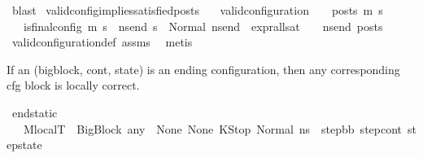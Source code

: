 \begin{isabellebody}
\ blast%
\endisatagproof
{\isafoldproof}%
%
\isadelimproof
\isanewline
%
\endisadelimproof
\isanewline
{}\isamarkupfalse%
\ valid{\isacharunderscore}{\kern0pt}config{\isacharunderscore}{\kern0pt}implies{\isacharunderscore}{\kern0pt}satisfied{\isacharunderscore}{\kern0pt}posts{\isacharcolon}{\kern0pt}\isanewline
\ \ \ {\isachardoublequoteopen}valid{\isacharunderscore}{\kern0pt}configuration\ {\isasymLambda}\ {\isasymGamma}\ {\isasymOmega}\ posts\ m{\isacharprime}{\kern0pt}\ s{\isacharprime}{\kern0pt}{\isachardoublequoteclose}\isanewline
\ \ \ {\isachardoublequoteopen}is{\isacharunderscore}{\kern0pt}final{\isacharunderscore}{\kern0pt}config\ {\isacharparenleft}{\kern0pt}m{\isacharprime}{\kern0pt}{\isacharcomma}{\kern0pt}\ s{\isacharprime}{\kern0pt}{\isacharparenright}{\kern0pt}\ {\isasymLongrightarrow}\ {\isacharparenleft}{\kern0pt}{\isasymforall}ns{\isacharunderscore}{\kern0pt}end{\isachardot}{\kern0pt}\ s{\isacharprime}{\kern0pt}\ {\isacharequal}{\kern0pt}\ Normal\ ns{\isacharunderscore}{\kern0pt}end\ {\isasymlongrightarrow}\ {\isacharparenleft}{\kern0pt}expr{\isacharunderscore}{\kern0pt}all{\isacharunderscore}{\kern0pt}sat\ {\isasymLambda}\ {\isasymGamma}\ {\isasymOmega}\ ns{\isacharunderscore}{\kern0pt}end{\isacharparenright}{\kern0pt}\ posts{\isacharparenright}{\kern0pt}{\isachardoublequoteclose}\isanewline
%
\isadelimproof
\ \ %
\endisadelimproof
%
\isatagproof
{}\isamarkupfalse%
\ valid{\isacharunderscore}{\kern0pt}configuration{\isacharunderscore}{\kern0pt}def\ assms\ \isamarkupfalse%
\ {\isacharparenleft}{\kern0pt}metis{\isacharparenright}{\kern0pt}%
\endisatagproof
{\isafoldproof}%
%
\isadelimproof
%
\endisadelimproof
%
\begin{isamarkuptext}%
If an  (bigblock, cont, state) is an ending configuration, then any corresponding cfg block is locally correct.%
\end{isamarkuptext}\isamarkuptrue%
\isamarkupfalse%
\ end{\isacharunderscore}{\kern0pt}static{\isacharcolon}{\kern0pt}\isanewline
\ \ \ {\isachardoublequoteopen}M{\isacharcomma}{\kern0pt}{\isasymLambda}{}{\isacharunderscore}{\kern0pt}local{\isacharcomma}{\kern0pt}{\isasymGamma}{\isacharcomma}{\kern0pt}{\isasymOmega}{\isacharcomma}{\kern0pt}T\ {\isasymturnstile}\ {\isasymlangle}{\isacharparenleft}{\kern0pt}BigBlock\ any\ {\isacharbrackleft}{\kern0pt}{\isacharbrackright}{\kern0pt}\ None\ None{\isacharcomma}{\kern0pt}\ KStop{\isacharcomma}{\kern0pt}\ Normal\ ns{}{\isacharparenright}{\kern0pt}{\isasymrangle}\ {\isasymlongrightarrow}\ {\isacharparenleft}{\kern0pt}step{\isacharunderscore}{\kern0pt}bb{\isacharcomma}{\kern0pt}\ step{\isacharunderscore}{\kern0pt}cont{\isacharcomma}{\kern0pt}\ step{\isacharunderscore}{\kern0pt}state{\isacharparenright}{\kern0pt}{\isachardoublequoteclose}\isanewline

\end{isabellebody}
